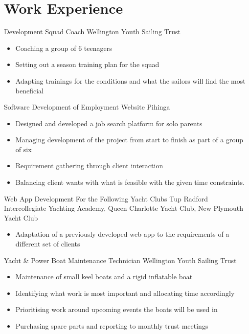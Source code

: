 \documentclass[a4paper]{twentysecondcv} %
\begin{document}

\section{Work Experience}

\begin{workexperience} %
    {Development Squad Coach}
    {Wellington Youth Sailing Trust}
    {
        \begin{itemize}
            \item Coaching a group of 6 teenagers
            \item Setting out a season training plan for the squad
            \item Adapting trainings for the conditions and what the sailors will find the most beneficial 
        \end{itemize}
    }

    {Software Development of Employment Website}
    {Pihinga}
    {
        \begin{itemize}
            \item Designed and developed a job search platform for solo parents
            \item Managing development of the project from start to finish as part of a group of six
            \item Requirement gathering through client interaction
            \item Balancing client wants with what is feasible with the given time constraints.
        \end{itemize}
    }

    {Web App Development For the Following Yacht Clubs}
    {Tup Radford Intercollegiate Yachting Academy, Queen Charlotte Yacht Club, New Plymouth Yacht Club}
    {
        \begin{itemize}
            \item Adaptation of a previously developed web app to the requirements of a different set of clients
        \end{itemize}
    }

    {Yacht \& Power Boat Maintenance Technician}
    {Wellington Youth Sailing Trust}
    {
        \begin{itemize}
            \item Maintenance of small keel boats and a rigid inflatable boat
            \item Identifying what work is most important and allocating time accordingly
            \item Prioritising work around upcoming events the boats will be used in
            \item Purchasing spare parts and reporting to monthly trust meetings
        \end{itemize}
    }


\end{workexperience}
\end{document}
